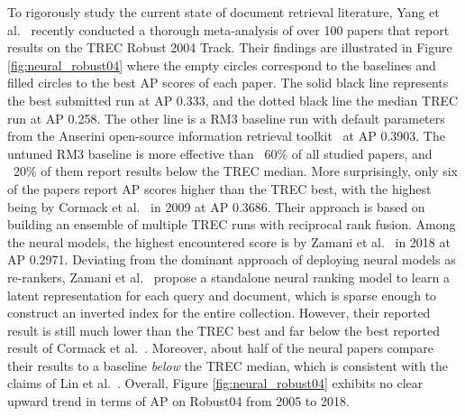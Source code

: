 To rigorously study the current state of document retrieval literature, Yang et al.~\cite{Yang_etal_SIGIR2019} recently conducted a thorough meta-analysis of over 100 papers that report results on the TREC Robust 2004 Track.
Their findings are illustrated in Figure \ref{fig:neural_robust04} where the empty circles correspond to the baselines and filled circles to the best AP scores of each paper.
The solid black line represents the best submitted run at AP 0.333, and the dotted black line the median TREC run at AP 0.258.
The other line is a RM3 baseline run with default parameters from the Anserini open-source information retrieval toolkit~\cite{Yang:2018:ARR:3289400.3239571} at AP 0.3903.
The untuned RM3 baseline is more effective than ~60\% of all studied papers, and ~20\% of them report results below the TREC median.
More surprisingly, only six of the papers report AP scores higher than the TREC best, with the highest being by Cormack et al.~\cite{Cormack:2009:RRF:1571941.1572114} in 2009 at AP 0.3686.
Their approach is based on building an ensemble of multiple TREC runs with reciprocal rank fusion.
Among the neural models, the highest encountered score is by Zamani et al.~\cite{zamani2018neural} in 2018 at AP 0.2971.
Deviating from the dominant approach of deploying neural models as re-rankers, Zamani et al.~\cite{zamani2018neural} propose a standalone neural ranking model to learn a latent representation for each query and document, which is sparse enough to construct an inverted index for the entire collection.
However, their reported result is still much lower than the TREC best and far below the best reported result of Cormack et al.~\cite{Cormack:2009:RRF:1571941.1572114}.
Moreover, about half of the neural papers compare their results to a baseline \textit{below} the TREC median, which is consistent with the claims of Lin et al.~\cite{lin2019neural}.
Overall, Figure \ref{fig:neural_robust04} exhibits no clear upward trend in terms of AP on Robust04 from 2005 to 2018.


